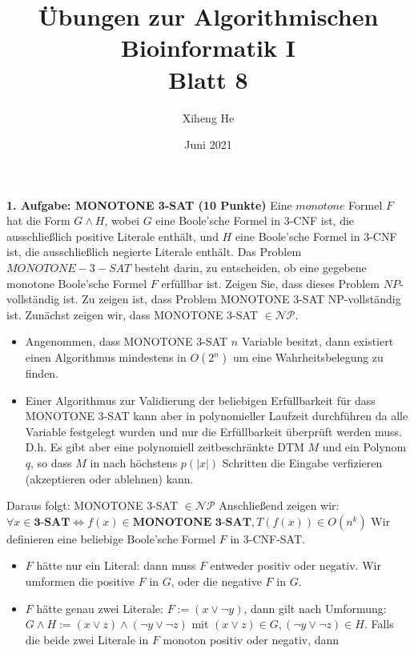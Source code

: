 \documentclass{article}
\title{Übungen zur Algorithmischen Bioinformatik I\\
Blatt 8}
\author{Xiheng He }
\date{Juni 2021}
\begin{document}
\maketitle
\begin{flushleft}
\textbf{1. Aufgabe: MONOTONE 3-SAT (10 Punkte)}
\newline
Eine $monotone$ Formel $F$ hat die Form $G \land H$, wobei $G$ eine Boole’sche Formel in 3-CNF ist, die
ausschließlich positive Literale enthält, und $H$ eine Boole’sche Formel in 3-CNF ist, die ausschließlich
negierte Literale enthält. Das Problem $MONOTONE-3-SAT$ besteht darin, zu entscheiden, ob eine gegebene monotone 
Boole’sche Formel $F$ erfüllbar ist. Zeigen Sie, dass dieses Problem $NP$-vollständig ist.
\newline
Zu zeigen ist, dass Problem MONOTONE 3-SAT NP-vollständig ist.
\newline
Zunächst zeigen wir, dass MONOTONE 3-SAT $\in \mathcal{N} \mathcal{P}$.
\begin{itemize}
    \item Angenommen, dass MONOTONE 3-SAT $n$ Variable besitzt, dann existiert einen Algorithmus mindestens in $O(2^n)$
    um eine Wahrheitsbelegung zu finden.
    \item Einer Algorithmus zur Validierung der beliebigen Erfüllbarkeit für dass MONOTONE 3-SAT kann aber in polynomieller
    Laufzeit durchführen da alle Variable festgelegt wurden und nur die Erfüllbarkeit überprüft werden muss.
    D.h. Es gibt aber eine polynomiell zeitbeschränkte DTM $M$ und ein Polynom $q$, so dass $M$ in nach höchstens 
    $p(|x|)$ Schritten die Eingabe verfizieren (akzeptieren oder ablehnen) kann.
\end{itemize}
Daraus folgt: MONOTONE 3-SAT $\in \mathcal{N} \mathcal{P}$
\newline
Anschließend zeigen wir: $\forall x \in \textbf{3-SAT} \Leftrightarrow f(x) \in \textbf{MONOTONE 3-SAT}, T(f(x)) \in O(n^k)$
\newline
Wir definieren eine beliebige Boole’sche Formel $F$ in 3-CNF-SAT.
\begin{itemize}
    \item $F$ hätte nur ein Literal: dann muss $F$ entweder positiv oder negativ. Wir umformen die positive $F$ in $G$,
    oder die negative $F$ in $G$. 
    \item $F$ hätte genau zwei Literale: $F := (x \lor \lnot y)$, dann gilt nach Umformung: $G \land H := (x \lor z) \land (\lnot y \lor \lnot z)$
    mit $(x \lor z) \in G, (\lnot y \lor \lnot z) \in H$. Falls die beide zwei Literale in $F$ monoton positiv oder negativ, dann 

\end{itemize}
\end{flushleft}
\end{document}
